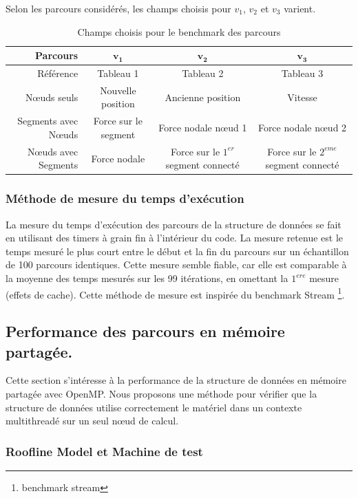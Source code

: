 Selon les parcours considérés, les champs choisis pour $v_1$, $v_2$ et $v_3$ varient. 

\begin{table}
	\begin{tabulary}{1.0\textwidth}{r||c|C|C}
		\textbf{Parcours} & $\bm{v_1}$ & $\bm{v_2}$ & $\bm{v_3}$\\
		\hline
		\hline
		Référence & Tableau 1 & Tableau 2 & Tableau 3 \\
		\hline
		Nœuds seuls & Nouvelle position & Ancienne position & Vitesse\\
		\hline
		Segments avec Nœuds & Force sur le segment & Force nodale nœud 1 & Force nodale nœud 2\\
		\hline
		Nœuds avec Segments & Force nodale & Force sur le $1^{er}$ segment connecté & Force sur le  $2^{eme}$ segment connecté\\
	\end{tabulary}
	\caption{ Champs choisis pour le benchmark des parcours }
\end{table}

\subsubsection{Méthode de mesure du temps d'exécution}

La mesure du temps d'exécution des parcours de la structure de données se fait en utilisant des timers à grain fin à l'intérieur du code. La mesure retenue est le temps mesuré le plus court entre le début et la fin du parcours sur un échantillon de 100 parcours identiques. Cette mesure semble fiable, car elle est comparable à la moyenne des temps mesurés sur les 99 itérations, en omettant la $1^{ere}$ mesure (effets de cache). Cette méthode de mesure est inspirée du benchmark Stream \footnote{benchmark stream}.

\subsection{Performance des parcours en mémoire partagée.}

Cette section s'intéresse à la performance de la structure de données en mémoire partagée avec OpenMP. Nous proposons une méthode pour vérifier que la structure de données utilise correctement le matériel dans un contexte multithreadé sur un seul nœud de calcul. 

\subsubsection{Roofline Model et Machine de test}

